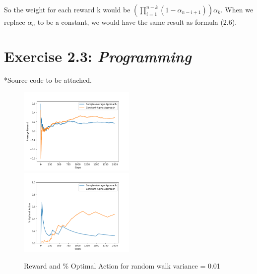 \documentclass[10pt,letterpaper]{article}
\begin{document}
So the weight for each reward k would be $(\prod_{i=1}^{n-k}(1-\alpha_{n-i+1}))\alpha_k$. When we replace $\alpha_n$ to be a constant, we would have the same result as formula (2.6).

\section*{Exercise 2.3: \textit{Programming} }
\label{2.3}
*Source code to be attached.
\begin{figure}[htp]
  \includegraphics[width=0.5\textwidth]{Reward-var-001}
  \includegraphics[width=0.5\textwidth]{Perc-var-001}
  \caption{Reward and \% Optimal Action for random walk variance = 0.01}
  \label{fig:var-001}
\end{figure}
\end{document}
